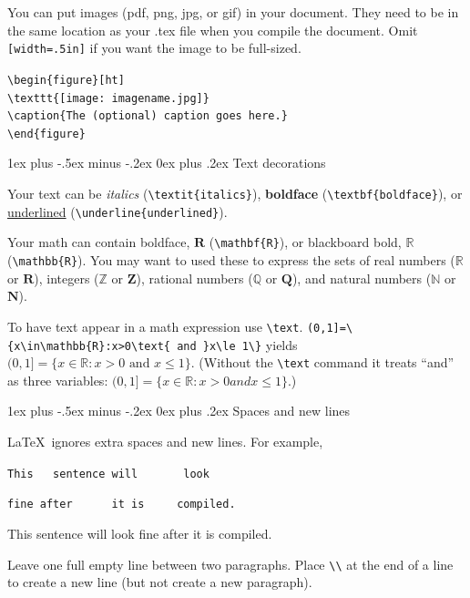 \documentclass[10pt,UTF8,a4paper]{ctexart}
\makeatletter
\renewcommand{\section}{\@startsection{section}{1}{0mm}%
                                {1ex plus -.5ex minus -.2ex}%
                                {0ex plus .2ex}%
                                {\normalfont\large\bfseries}}
\renewcommand{\subsection}{\@startsection{subsection}{2}{0mm}%
                                {1ex plus -.5ex minus -.2ex}%
                                {0ex plus .2ex}%
                                {\normalfont\normalsize\bfseries}}
\makeatother
\begin{document}
\begin{multicols}{3}
You can put images (pdf, png, jpg, or gif) in your document. They need to be in the same location as your .tex file when you compile the document. Omit   \verb![width=.5in]! if you want the image to be full-sized.

\verb!\begin{figure}[ht]!\\
\verb!\texttt{[image: imagename.jpg]}!\\
\verb!\caption{The (optional) caption goes here.}!\\
\verb!\end{figure}!

\subsection{Text decorations}

Your text can be \textit{italics} (\verb!\textit{italics}!), \textbf{boldface} (\verb!\textbf{boldface}!), or \underline{underlined} (\verb!\underline{underlined}!).

Your math can contain boldface, $\mathbf{R}$ (\verb!\mathbf{R}!), or blackboard bold, $\mathbb{R}$ (\verb!\mathbb{R}!). You may want to used these to express the sets of real numbers ($\mathbb{R}$ or $\mathbf{R}$), integers ($\mathbb{Z}$ or $\mathbf{Z}$), rational numbers ($\mathbb{Q}$ or $\mathbf{Q}$), and natural numbers ($\mathbb{N}$ or $\mathbf{N}$).

To have text appear in a math expression use \verb!\text!. \verb!(0,1]=\{x\in\mathbb{R}:x>0\text{ and }x\le 1\}! yields $(0,1]=\{x\in\mathbb{R}:x>0\text{ and }x\le 1\}$. (Without the \verb!\text! command it treats ``and'' as three variables: $(0,1]=\{x\in\mathbb{R}:x>0 and x\le 1\}$.)



\section{Spaces and new lines}

\LaTeX\ ignores extra spaces and new lines. For example, 

\verb!This   sentence will       look!

\verb!fine after      it is     compiled.!

This   sentence will       look
fine after      it is     compiled.


Leave one full empty line between two paragraphs. Place \verb!\\! at the end of a line to create a new line (but not create a new paragraph).


\end{multicols}
\end{document}

